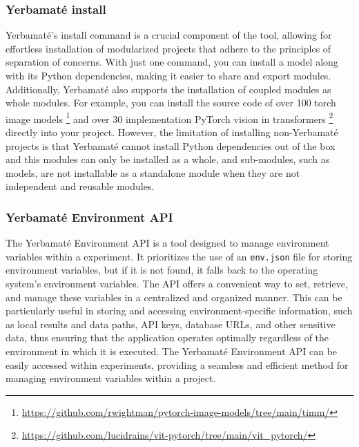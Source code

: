 \subsubsection{Yerbamaté install}
Yerbamaté's install command is a crucial component of the tool, allowing for effortless installation of modularized projects that adhere to the principles of separation of concerns. With just one command, you can install a model along with its Python dependencies, making it easier to share and export modules. Additionally, Yerbamaté also supports the installation of coupled modules as whole modules. For example, you can install the source code of over 100 torch image models \footnote{\url{https://github.com/rwightman/pytorch-image-models/tree/main/timm/}} and over 30 implementation PyTorch vision in transformers \footnote{\url{https://github.com/lucidrains/vit-pytorch/tree/main/vit\_pytorch/}} directly into your project. However, the limitation of installing non-Yerbamaté projects is that Yerbamaté cannot install Python dependencies out of the box and this modules can only be installed as a whole, and sub-modules, such as models, are not installable as a standalone module when they are not independent and reusable modules.

\subsubsection{Yerbamaté Environment API}

The Yerbamaté Environment API is a tool designed to manage environment variables within a experiment. It prioritizes the use of an \texttt{env.json} file for storing environment variables, but if it is not found, it falls back to the operating system's environment variables. The API offers a convenient way to set, retrieve, and manage these variables in a centralized and organized manner. This can be particularly useful in storing and accessing environment-specific information, such as local results and data paths, API keys, database URLs, and other sensitive data, thus ensuring that the application operates optimally regardless of the environment in which it is executed. The Yerbamaté Environment API can be easily accessed within experiments, providing a seamless and efficient method for managing environment variables within a project. 





